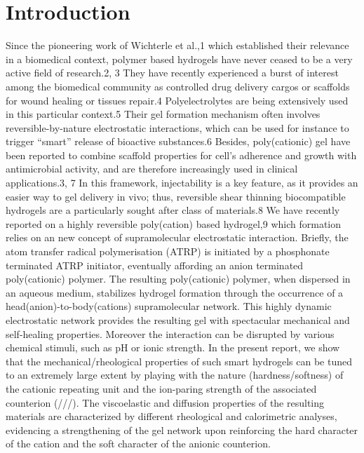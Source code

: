 \documentclass[journal=jacsat,manuscript=article]{achemso}
\begin{document}
\section{Introduction}
Since the pioneering work of Wichterle et al.,1 which established their relevance in a biomedical context, polymer based hydrogels have never ceased to be a very active field of research.2, 3 They have recently experienced a burst of interest among the biomedical community as controlled drug delivery cargos or scaffolds for wound healing or tissues repair.4 Polyelectrolytes are being extensively used in this particular context.5 Their gel formation mechanism often involves reversible-by-nature electrostatic interactions, which can be used for instance to trigger ``smart'' release of bioactive substances.6 Besides, poly(cationic) gel have been reported to combine scaffold properties for cell’s adherence and growth with antimicrobial activity, and are therefore increasingly used in clinical applications.3, 7 In this framework, injectability is a key feature, as it provides an easier way to gel delivery in vivo; thus, reversible shear thinning biocompatible hydrogels are a particularly sought after class of materials.8
We have recently reported on a highly reversible poly(cation) based hydrogel,9 which formation relies on an new concept of supramolecular  electrostatic interaction. Briefly, the atom transfer radical polymerisation (ATRP) is initiated by a phosphonate terminated ATRP initiator, eventually affording an anion terminated poly(cationic) polymer. The resulting poly(cationic) polymer, when dispersed in an aqueous medium, stabilizes hydrogel formation through the occurrence of a head(anion)-to-body(cations) supramolecular network. This highly dynamic electrostatic network provides the resulting gel with spectacular mechanical and self-healing properties. Moreover the interaction can be disrupted by various chemical stimuli, such as pH or ionic strength.
In the present report, we show that the mechanical/rheological properties of such smart hydrogels can be tuned to an extremely large extent by playing with the nature (hardness/softness) of the cationic repeating unit and the ion-paring strength of the associated counterion (///). The viscoelastic and diffusion properties of the resulting materials are characterized by different rheological and calorimetric analyses, evidencing a strengthening of the gel network upon reinforcing the hard character of the cation and the soft character of the anionic counterion.
\end{document}
